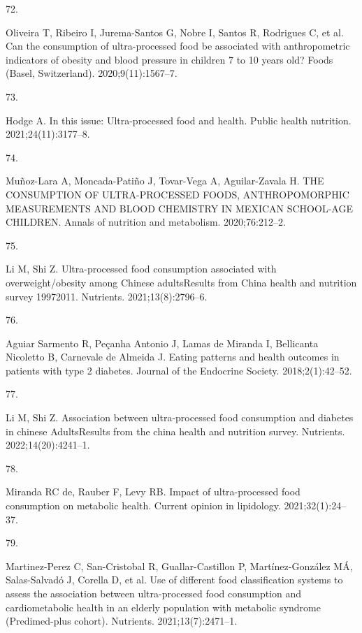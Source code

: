 \documentclass[
]{article}
\newlength{\cslhangindent}
\newlength{\csllabelwidth}
\newlength{\cslentryspacingunit} %
\newenvironment{CSLReferences}[2] %
 {%
  \setlength{\parindent}{0pt}
  \ifodd #1
  \let\oldpar\par
  \def\par{\hangindent=\cslhangindent\oldpar}
  \fi
  \setlength{\parskip}{#2\cslentryspacingunit}
 }%
 {}
\newcommand{\CSLLeftMargin}[1]{\parbox[t]{\csllabelwidth}{#1}}
\newcommand{\CSLRightInline}[1]{\parbox[t]{\linewidth - \csllabelwidth}{#1}\break}
\begin{document}
\begin{CSLReferences}{0}{0}
\leavevmode{}%
\CSLLeftMargin{72. }%
\CSLRightInline{Oliveira T, Ribeiro I, Jurema-Santos G, Nobre I, Santos
R, Rodrigues C, et al. Can the consumption of ultra-processed food be
associated with anthropometric indicators of obesity and blood pressure
in children 7 to 10 years old? Foods (Basel, Switzerland).
2020;9(11):1567--7. }

\leavevmode{}%
\CSLLeftMargin{73. }%
\CSLRightInline{Hodge A. In this issue: Ultra-processed food and health.
Public health nutrition. 2021;24(11):3177--8. }

\leavevmode{}%
\CSLLeftMargin{74. }%
\CSLRightInline{Muñoz-Lara A, Moncada-Patiño J, Tovar-Vega A,
Aguilar-Zavala H. THE CONSUMPTION OF ULTRA-PROCESSED FOODS,
ANTHROPOMORPHIC MEASUREMENTS AND BLOOD CHEMISTRY IN MEXICAN SCHOOL-AGE
CHILDREN. Annals of nutrition and metabolism. 2020;76:212--2. }

\leavevmode{}%
\CSLLeftMargin{75. }%
\CSLRightInline{Li M, Shi Z. Ultra-processed food consumption associated
with overweight/obesity among Chinese adults{\textemdash}Results from
China health and nutrition survey 1997{\textendash}2011. Nutrients.
2021;13(8):2796--6. }

\leavevmode{}%
\CSLLeftMargin{76. }%
\CSLRightInline{Aguiar Sarmento R, Peçanha Antonio J, Lamas de Miranda
I, Bellicanta Nicoletto B, Carnevale de Almeida J. Eating patterns and
health outcomes in patients with type 2 diabetes. Journal of the
Endocrine Society. 2018;2(1):42--52. }

\leavevmode{}%
\CSLLeftMargin{77. }%
\CSLRightInline{Li M, Shi Z. Association between ultra-processed food
consumption and diabetes in chinese Adults{\textemdash}Results from the
china health and nutrition survey. Nutrients. 2022;14(20):4241--1. }

\leavevmode{}%
\CSLLeftMargin{78. }%
\CSLRightInline{Miranda RC de, Rauber F, Levy RB. Impact of
ultra-processed food consumption on metabolic health. Current opinion in
lipidology. 2021;32(1):24--37. }

\leavevmode{}%
\CSLLeftMargin{79. }%
\CSLRightInline{Martinez-Perez C, San-Cristobal R, Guallar-Castillon P,
Martínez-González MÁ, Salas-Salvadó J, Corella D, et al. Use of
different food classification systems to assess the association between
ultra-processed food consumption and cardiometabolic health in an
elderly population with metabolic syndrome (Predimed-plus cohort).
Nutrients. 2021;13(7):2471--1. }


\end{CSLReferences}
\end{document}
